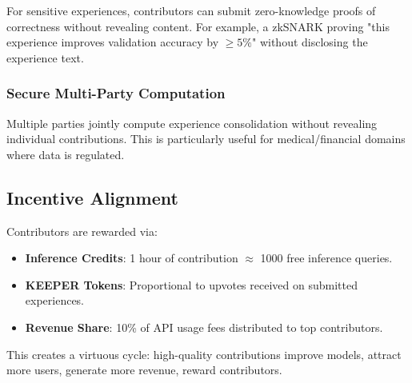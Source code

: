 For sensitive experiences, contributors can submit zero-knowledge proofs of correctness without revealing content. For example, a zkSNARK \cite{bitansky2013snarks} proving "this experience improves validation accuracy by $\geq 5\%$" without disclosing the experience text.

\subsubsection{Secure Multi-Party Computation}

Multiple parties jointly compute experience consolidation without revealing individual contributions. This is particularly useful for medical/financial domains where data is regulated.

\subsection{Incentive Alignment}

Contributors are rewarded via:
\begin{itemize}
\item \textbf{Inference Credits}: 1 hour of contribution $\approx$ 1000 free inference queries.
\item \textbf{KEEPER Tokens}: Proportional to upvotes received on submitted experiences.
\item \textbf{Revenue Share}: 10\% of API usage fees distributed to top contributors.
\end{itemize}

This creates a virtuous cycle: high-quality contributions improve models, attract more users, generate more revenue, reward contributors.

